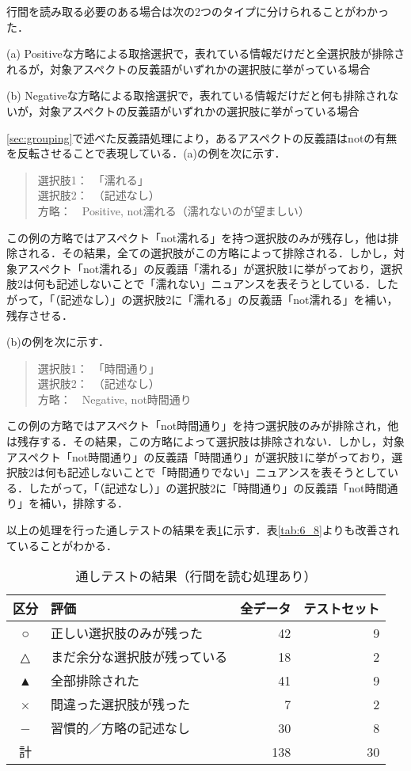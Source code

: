 \documentclass[japanese]{jnlp_1.3a}
\begin{document}
行間を読み取る必要のある場合は次の2つのタイプに分けられることがわかった．
\begin{description}
\item{(a)} Positiveな方略による取捨選択で，表れている情報だけだと全選択肢が排除されるが，対象アスペクトの反義語がいずれかの選択肢に挙がっている場合
\item{(b)} Negativeな方略による取捨選択で，表れている情報だけだと何も排除されないが，対象アスペクトの反義語がいずれかの選択肢に挙がっている場合
\end{description}
\ref{sec:grouping}で述べた反義語処理により，あるアスペクトの反義語はnotの有無を反転させることで表現している．(a)の例を次に示す．
	\begin{quote}
	選択肢1：　「濡れる」\\
	選択肢2：　（記述なし）\\
	方略：　Positive, not濡れる（濡れないのが望ましい）
	\end{quote}
この例の方略ではアスペクト「not濡れる」を持つ選択肢のみが残存し，他は排除される．その結果，全ての選択肢がこの方略によって排除される．しかし，対象アスペクト「not濡れる」の反義語「濡れる」が選択肢1に挙がっており，選択肢2は何も記述しないことで「濡れない」ニュアンスを表そうとしている．したがって，「（記述なし）」の選択肢2に「濡れる」の反義語「not濡れる」を補い，残存させる．

(b)の例を次に示す．
	\begin{quote}
	選択肢1：　「時間通り」\\
	選択肢2：　（記述なし）\\
	方略：　Negative, not時間通り
	\end{quote}
この例の方略ではアスペクト「not時間通り」を持つ選択肢のみが排除され，他は残存する．その結果，この方略によって選択肢は排除されない．しかし，対象アスペクト「not時間通り」の反義語「時間通り」が選択肢1に挙がっており，選択肢2は何も記述しないことで「時間通りでない」ニュアンスを表そうとしている．したがって，「（記述なし）」の選択肢2に「時間通り」の反義語「not時間通り」を補い，排除する．

以上の処理を行った通しテストの結果を表\ref{tab:6_8gyoukan}に示す．表\ref{tab:6_8}よりも改善されていることがわかる．

\begin{table}[t]
  \caption{通しテストの結果（行間を読む処理あり）}
  \begin{center}
    \begin{tabular}{|c l|r|r|} \hline
	区分 & 評価 & 全データ & テストセット\\ \hline
	○ & 正しい選択肢のみが残った     & 42 &  9\\
	△ & まだ余分な選択肢が残っている & 18 &  2\\
	▲ & 全部排除された               & 41 &  9\\
	× & 間違った選択肢が残った       &  7 &  2\\
	− & 習慣的／方略の記述なし       & 30 &  8\\ \hline
	計 &                             & 138 & 30\\ \hline
    \end{tabular}
    \label{tab:6_8gyoukan}
  \end{center}
\end{table}
\end{document}
